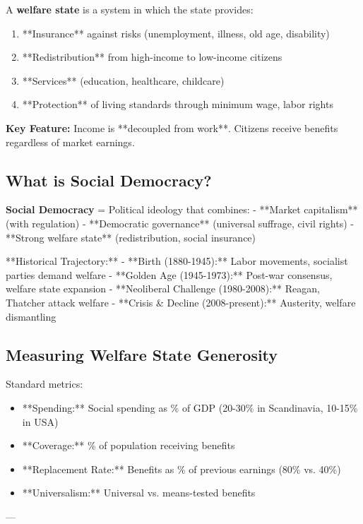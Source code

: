 A \textbf{welfare state} is a system in which the state provides:
\begin{enumerate}
\item **Insurance** against risks (unemployment, illness, old age, disability)
\item **Redistribution** from high-income to low-income citizens
\item **Services** (education, healthcare, childcare)
\item **Protection** of living standards through minimum wage, labor rights
\end{enumerate}

\textbf{Key Feature:} Income is **decoupled from work**. Citizens receive benefits regardless of market earnings.

\subsection{What is Social Democracy?}

\textbf{Social Democracy} = Political ideology that combines:
- **Market capitalism** (with regulation)
- **Democratic governance** (universal suffrage, civil rights)
- **Strong welfare state** (redistribution, social insurance)

**Historical Trajectory:**
- **Birth (1880-1945):** Labor movements, socialist parties demand welfare
- **Golden Age (1945-1973):** Post-war consensus, welfare state expansion
- **Neoliberal Challenge (1980-2008):** Reagan, Thatcher attack welfare
- **Crisis & Decline (2008-present):** Austerity, welfare dismantling

\subsection{Measuring Welfare State Generosity}

Standard metrics:
\begin{itemize}
\item **Spending:** Social spending as \% of GDP (20-30\% in Scandinavia, 10-15\% in USA)
\item **Coverage:** \% of population receiving benefits
\item **Replacement Rate:** Benefits as \% of previous earnings (80\% vs. 40\%)
\item **Universalism:** Universal vs. means-tested benefits
\end{itemize}

---

\clearpage


